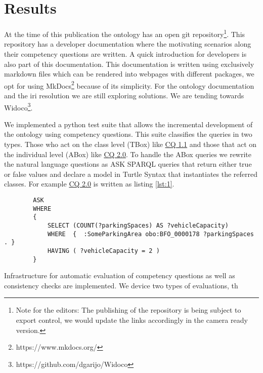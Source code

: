 \section{Results}
\label{results}

At the time of this publication the ontology has an open git
repository\footnote{Note for the editors: The publishing of the repository is
being subject to export control, we would update the links accordingly in the
camera ready version. }. This repository has a developer documentation where the
motivating scenarios along their competency questions are written. A quick
introduction for developers is also part of this documentation. This
documentation is written using exclusively markdown files which can be rendered
into webpages with different packages, we opt for using
MkDocs\footnote{https://www.mkdocs.org/} because of its simplicity. For the
ontology documentation and the iri resolution we are still exploring solutions.
We are tending towards Widoco\footnote{https://github.com/dgarijo/Widoco}.

We implemented a python test suite that allows the incremental development of
the ontology using competency questions. This suite classifies the queries in
two types. Those who act on the class level (TBox) like \hyperref[CQ1.1]{CQ 1.1}
and those that act on the individual level (ABox) like \hyperref[CQ2.0]{CQ 2.0}.
To handle the ABox queries we rewrite the natural language questions as ASK
SPARQL queries that return either true or false values and declare a model in
Turtle Syntax that instantiates the referred classes. For example
\hyperref[CQ2.0]{CQ 2.0} is written as listing \ref{lst:1}.

\begin{listing}[H]
    \begin{verbatim}
        ASK
        WHERE
        {
            SELECT (COUNT(?parkingSpaces) AS ?vehicleCapacity)  
            WHERE  {  :SomeParkingArea obo:BFO_0000178 ?parkingSpaces . }
            HAVING ( ?vehicleCapacity = 2 )
        }
    \end{verbatim}
    \caption{Example ABox query.(Given a parking area with two parking places). What is the (vehicle) capacity of parking lot P? (2). The namespaces are omitted.}
    \label{lst:1}
\end{listing}

Infrastructure
for automatic evaluation of competency questions as well as consistency checks
are implemented. We device two types of evaluations, th


